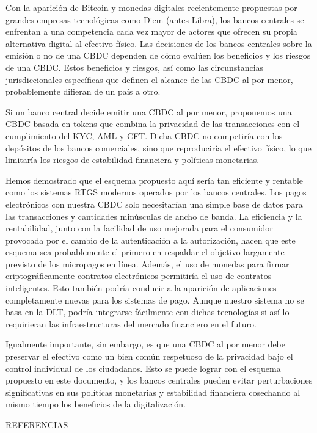 \documentclass[10pt,spanish]{article}
\begin{document}
Con la aparición de Bitcoin y monedas digitales recientemente propuestas
por grandes empresas tecnológicas como Diem (antes Libra), los bancos
centrales se enfrentan a una competencia cada vez mayor de actores que
ofrecen su propia alternativa digital al efectivo físico. Las decisiones
de los bancos centrales sobre la emisión o no de una CBDC dependen de
cómo evalúen los beneficios y los riesgos de una CBDC. Estos beneficios
y riesgos, así como las circunstancias jurisdiccionales específicas que
definen el alcance de las CBDC al por menor, probablemente difieran de
un país a otro.

Si un banco central decide emitir una CBDC al por menor, proponemos una
CBDC basada en tokens que combina la privacidad de las transacciones con
el cumplimiento del KYC, AML y CFT. Dicha CBDC no competiría con los
depósitos de los bancos comerciales, sino que reproduciría el efectivo
físico, lo que limitaría los riesgos de estabilidad financiera y
políticas monetarias.

Hemos demostrado que el esquema propuesto aquí sería tan eficiente y
rentable como los sistemas RTGS modernos operados por los bancos
centrales. Los pagos electrónicos con nuestra CBDC solo necesitarían una
simple base de datos para las transacciones y cantidades minúsculas de
ancho de banda. La eficiencia y la rentabilidad, junto con la facilidad
de uso mejorada para el consumidor provocada por el cambio de la
autenticación a la autorización, hacen que este esquema sea
probablemente el primero en respaldar el objetivo largamente previsto de
los micropagos en línea. Además, el uso de monedas para firmar
criptográficamente contratos electrónicos permitiría el uso de contratos
inteligentes. Esto también podría conducir a la aparición de
aplicaciones completamente nuevas para los sistemas de pago. Aunque
nuestro sistema no se basa en la DLT, podría integrarse fácilmente con
dichas tecnologías si así lo requirieran las infraestructuras del
mercado financiero en el futuro.

Igualmente importante, sin embargo, es que una CBDC al por menor debe
preservar el efectivo como un bien común respetuoso de la privacidad
bajo el control individual de los ciudadanos. Esto se puede lograr con
el esquema propuesto en este documento, y los bancos centrales pueden
evitar perturbaciones significativas en sus políticas monetarias y
estabilidad financiera cosechando al mismo tiempo los beneficios de la
digitalización.


\newpage
REFERENCIAS
\end{document}
